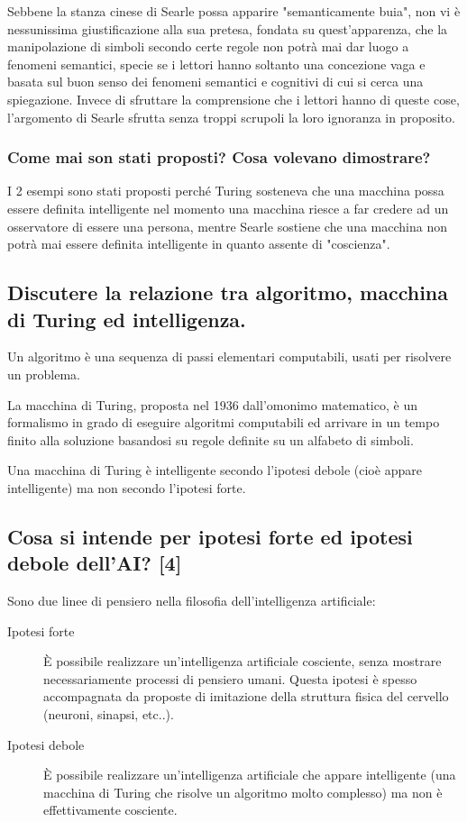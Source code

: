 \documentclass[\main/main.tex]{subfiles}
\begin{document}
Sebbene la stanza cinese di Searle possa apparire "semanticamente buia", non vi è nessunissima giustificazione alla sua pretesa, fondata su quest'apparenza, che la manipolazione di simboli secondo certe regole non potrà mai dar luogo a fenomeni semantici, specie se i lettori hanno soltanto una concezione vaga e basata sul buon senso dei fenomeni semantici e cognitivi di cui si cerca una spiegazione. Invece di sfruttare la comprensione che i lettori hanno di queste cose, l'argomento di Searle sfrutta senza troppi scrupoli la loro ignoranza in proposito.

\subsubsection{Come mai son stati proposti? Cosa volevano dimostrare?}
I 2 esempi sono stati proposti perché Turing sosteneva che una macchina possa essere definita intelligente nel momento una macchina riesce a far credere ad un osservatore di essere una persona, mentre Searle sostiene che una macchina non potrà mai essere definita intelligente in quanto assente di "coscienza".

\subsection{Discutere la relazione tra algoritmo, macchina di Turing ed intelligenza.}
Un algoritmo è una sequenza di passi elementari computabili, usati per risolvere un problema.

La macchina di Turing, proposta nel 1936 dall'omonimo matematico, è un formalismo in grado di eseguire algoritmi computabili ed arrivare in un tempo finito alla soluzione basandosi su regole definite su un alfabeto di simboli.

Una macchina di Turing è intelligente secondo l'ipotesi debole (cioè appare intelligente) ma non secondo l'ipotesi forte.

\subsection{Cosa si intende per ipotesi forte ed ipotesi debole dell'AI? [4]}
Sono due linee di pensiero nella filosofia dell'intelligenza artificiale:
\begin{description}
  \item[Ipotesi forte] È possibile realizzare un'intelligenza artificiale cosciente, senza mostrare necessariamente processi di pensiero umani. Questa ipotesi è spesso accompagnata da proposte di imitazione della struttura fisica del cervello (neuroni, sinapsi, etc..).
  \item[Ipotesi debole] È possibile realizzare un'intelligenza artificiale che appare intelligente (una macchina di Turing che risolve un algoritmo molto complesso) ma non è effettivamente cosciente.
\end{description}
\end{document}
